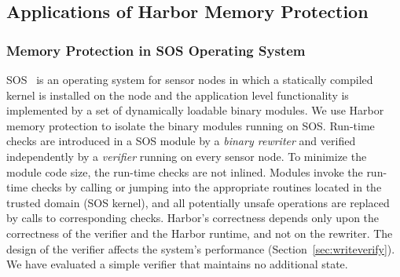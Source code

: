 
\subsection{Applications of Harbor Memory Protection}
%
\subsubsection{Memory Protection in SOS Operating System}
%
SOS~\cite{ram05sos} is an operating system for sensor nodes in which a
statically compiled kernel is installed on the node and the
application level functionality is implemented by a set of dynamically
loadable binary modules.
%
We use Harbor memory protection to isolate the binary modules running
on SOS.
%
Run-time checks are introduced in a SOS module by a \emph{binary rewriter} and
verified independently by a \emph{verifier} running on every sensor
node.
%
To minimize the module code size, the run-time checks are not inlined.
%
Modules invoke the run-time checks by calling or jumping into the
appropriate routines located in the trusted domain (SOS kernel), and
%
all potentially unsafe operations are replaced by calls to
corresponding checks.
%
%
Harbor's correctness depends only upon the correctness of the
verifier and the Harbor runtime, and not on the rewriter.
%
The design of the verifier affects the system's performance
(Section~\ref{sec:writeverify}).
%
We have evaluated a simple verifier that maintains no additional
state.
%

